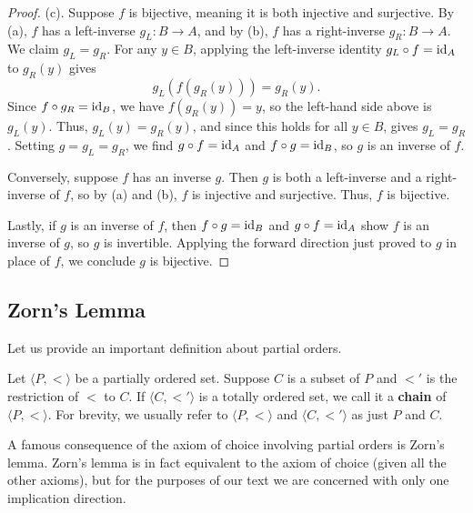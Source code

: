\begin{proof}
	(c).
	Suppose $f$ is bijective, meaning it is both injective and surjective. 
	By (a), $f$ has a left-inverse $g_{L}:B\rightarrow A$, and by (b), $f$ has a right-inverse $g_{R}:B\rightarrow A$. 
	We claim $g_{L} = g_{R}$. 
	For any $y\in B$, applying the left-inverse identity $g_{L}\circ f = \operatorname{id}_{A}$ to $g_{R}(y)$ gives 
	\[ g_{L}(f(g_{R}(y))) = g_{R}(y). \]
	Since $f\circ g_{R} = \operatorname{id}_{B}$, we have $f(g_{R}(y)) = y$, so the left-hand side above is $g_{L}(y)$.
	Thus, $g_{L}(y) = g_{R}(y)$, and since this holds for all $y\in B$,  gives $g_{L} = g_{R}$. 
	Setting $g = g_{L} = g_{R}$, we find $g\circ f = \operatorname{id}_{A}$ and $f\circ g = \operatorname{id}_{B}$, so $g$ is an inverse of $f$. 
	
	Conversely, suppose $f$ has an inverse $g$. 
	Then $g$ is both a left-inverse and a right-inverse of $f$, so by (a) and (b), $f$ is injective and surjective.
	Thus, $f$ is bijective. 
	
	Lastly, if $g$ is an inverse of $f$, then $f\circ g = \operatorname{id}_{B}$ and $g\circ f = \operatorname{id}_{A}$ show $f$ is an inverse of $g$, so $g$ is invertible. 
	Applying the forward direction just proved to $g$ in place of $f$, we conclude $g$ is bijective.
\end{proof}

\subsection{Zorn's Lemma}

Let us provide an important definition about partial orders.

\begin{definition}
	Let $\langle P, <\rangle$ be a partially ordered set. 
	Suppose $C$ is a subset of $P$ and $<'$ is the restriction of $<$ to $C$.
	If $\langle C, <'\rangle$ is a totally ordered set, we call it a \textbf{chain} of $\langle P, <\rangle$. 
	For brevity, we usually refer to $\langle P, <\rangle$ and $\langle C, <'\rangle$ as just $P$ and $C$. 
\end{definition}

A famous consequence of the axiom of choice involving partial orders is Zorn's lemma.
Zorn's lemma is in fact equivalent to the axiom of choice (given all the other axioms), but for the purposes of our text we are concerned with only one implication direction. 

